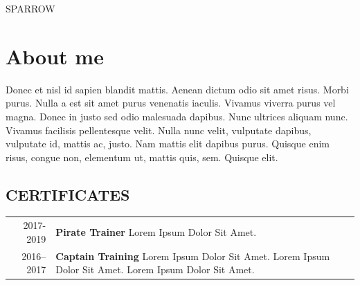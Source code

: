 \documentclass[11pt]{article}
\newcommand{\yourfirstname}
{JACK} %
\newcommand{\yourlastname}
{SPARROW} %
\begin{document}
\vspace{1em}
\nametag{\yourfirstname} 
{ }
{\yourlastname} 



\section{About me} %
{Donec et nisl id sapien blandit mattis. Aenean dictum odio sit amet risus. Morbi purus. Nulla a est sit amet
purus venenatis iaculis. Vivamus viverra purus vel magna. Donec in justo sed odio malesuada dapibus. Nunc
ultrices aliquam nunc. Vivamus facilisis pellentesque velit. Nulla nunc velit, vulputate dapibus, vulputate id,
mattis ac, justo. Nam mattis elit dapibus purus. Quisque enim risus, congue non, elementum ut, mattis quis,
sem. Quisque elit.}
\vspace{2em}
        \subsection{CERTIFICATES} %
        \begin{tabular}{r p{}}
                {2017-2019} %
                & \textbf{Pirate Trainer} \newline %
                { Lorem Ipsum Dolor Sit Amet. } \\ %
            2016--2017 & \textbf{Captain Training} \newline
                { Lorem Ipsum Dolor Sit Amet. Lorem Ipsum Dolor Sit Amet. \newline Lorem Ipsum Dolor Sit Amet. }
        \end{tabular}
        
\end{document}
